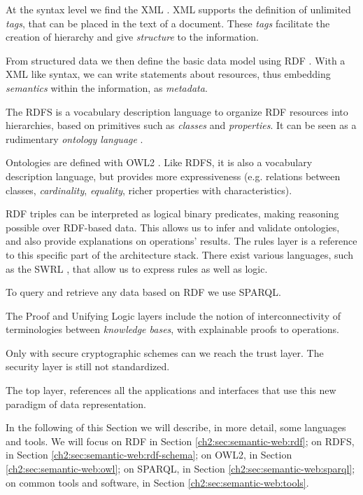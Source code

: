 At the syntax level we find the \gls{XML} \autocite{W3c_undated-ep}. \gls{XML} supports the definition of unlimited \emph{tags}, that can be placed in the text of a document. These \emph{tags} facilitate the creation of hierarchy and give \emph{structure} to the information.

From structured data we then define the basic data model using \gls{RDF} \autocite{W3c_undated-vq}. With a \gls{XML} like syntax, we can write statements about resources, thus embedding  \emph{semantics} within the information, as \emph{metadata}.

The \gls{RDFS} \autocite{W3c_undated-mp} is a vocabulary description language to organize \gls{RDF} resources into hierarchies, based on primitives such as \emph{classes} and \emph{properties}. It can be seen as a rudimentary \emph{ontology language} \autocite{Antoniou2012-nj}.

Ontologies are defined with \gls{OWL2} \autocite{W3c_undated-dr}. Like \gls{RDFS}, it is also a vocabulary description language, but provides more expressiveness (e.g. relations between classes, \emph{cardinality}, \emph{equality}, richer properties with characteristics).

\gls{RDF} triples can be interpreted as logical binary predicates, making reasoning possible over \gls{RDF}-based data. This allows us to infer and validate ontologies, and also provide explanations on operations' results. The rules layer is a reference to this specific part of the architecture stack. There exist various languages, such as the \gls{SWRL} \autocite{W3c2004-rn}, that allow us to express rules as well as logic.

To query and retrieve any data based on \gls{RDF} we use \gls{SPARQL}.

The Proof and Unifying Logic layers include the notion of interconnectivity of terminologies between \emph{knowledge bases}, with explainable proofs to operations.

Only with secure cryptographic schemes can we reach the trust layer. The security layer is still not standardized.

The top layer, references all the applications and interfaces that use this new paradigm of data representation.

In the following of this Section we will describe, in more detail, some languages and tools. We will focus on \gls{RDF} in Section \ref{ch2:sec:semantic-web:rdf}; on \gls{RDFS}, in Section \ref{ch2:sec:semantic-web:rdf-schema}; on \gls{OWL2}, in Section \ref{ch2:sec:semantic-web:owl}; on \gls{SPARQL}, in Section \ref{ch2:sec:semantic-web:sparql}; on common tools and software, in Section \ref{ch2:sec:semantic-web:tools}.

